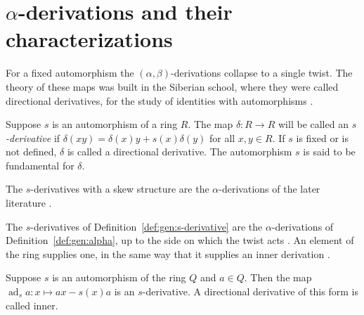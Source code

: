 \section{$\alpha$-derivations and their characterizations}\label{sec:generalized-twisted:alpha-derivations}

For a fixed automorphism the $(\alpha,\beta)$-derivations collapse to a
single twist. The theory of these maps was built in the Siberian school,
where they were called directional derivatives, for the study of identities
with automorphisms \cite[p.~1045]{KharchenkoPopov1991}.

\begin{definition}\label{def:gen:s-derivative}
Suppose $s$ is an automorphism of a ring $R$. The map
$\delta\colon R\to R$ will be called an \emph{$s$-derivative} if
$\delta(xy)=\delta(x)y+s(x)\delta(y)$ for all $x,y\in R$. If $s$ is fixed or
is not defined, $\delta$ is called a directional derivative. The
automorphism $s$ is said to be fundamental for $\delta$.
\end{definition}

The $s$-derivatives with a skew structure are the $\alpha$-derivations of the
later literature \cite[p.~885]{DeFilippisFosner2012}.

The $s$-derivatives of Definition~\ref{def:gen:s-derivative} are the
$\alpha$-derivations of Definition~\ref{def:gen:alpha}, up to the side on
which the twist acts \cite[p.~885]{DeFilippisFosner2012}. An element of the
ring supplies one, in the same way that it supplies an inner derivation
\cite[p.~1045]{KharchenkoPopov1991}.

\begin{remark}\label{rem:gen:inner-s}
Suppose $s$ is an automorphism of the ring $Q$ and $a\in Q$. Then the map
$\operatorname{ad}_{s}a\colon x\mapsto ax-s(x)a$ is an $s$-derivative. A
directional derivative of this form is called inner.
\end{remark}

